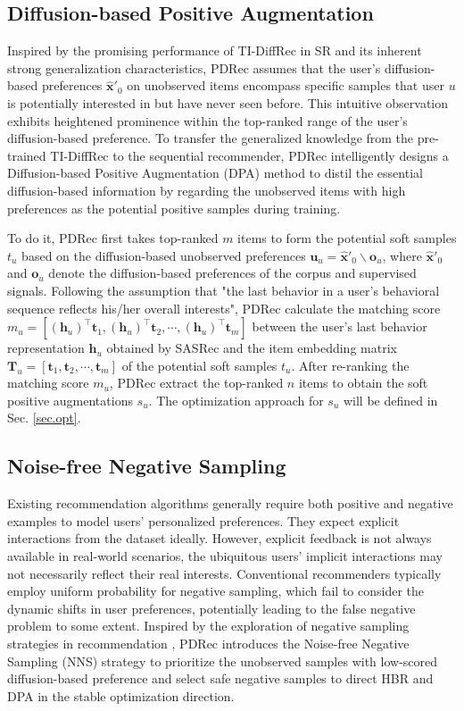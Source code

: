 \documentclass[letterpaper]{article} %
\begin{document}
\subsection{Diffusion-based Positive Augmentation}
Inspired by the promising performance of TI-DiffRec in SR and its inherent strong generalization characteristics, PDRec assumes that the user's diffusion-based preferences $\bm{\hat{x}'}_{0}$ on unobserved items encompass specific samples that user $u$ is potentially interested in but have never seen before. This intuitive observation exhibits heightened prominence within the top-ranked range of the user's diffusion-based preference. To transfer the generalized knowledge from the pre-trained TI-DiffRec to the sequential recommender, PDRec intelligently designs a Diffusion-based Positive Augmentation (DPA) method to distil the essential diffusion-based information by regarding the unobserved items with high preferences as the potential positive samples during training.

To do it, PDRec first takes top-ranked $m$ items to form the potential soft samples $t_{u}$ based on the diffusion-based unobserved preferences $\bm{u}_{u}\!=\!\bm{\hat{x}'}_{0}\!\backslash\!\bm{o}_{u}$, where $\bm{\hat{x}'}_{0}$ and $\bm{o}_{u}$ denote the diffusion-based preferences of the corpus and supervised signals.
Following the assumption that "the last behavior in a user's behavioral sequence reflects his/her overall interests", PDRec calculate the matching score
$m_u=[(\bm{h}_u)^\top\bm{t}_1,(\bm{h}_u)^\top\bm{t}_2,\cdots,(\bm{h}_u)^\top\bm{t}_m]$
between the user's last behavior representation $\bm{h}_u$ obtained by SASRec \cite{SASRec} and the item embedding matrix $\bm{T}_u=[\bm{t}_1,\bm{t}_2,\cdots,\bm{t}_m]$ of the potential soft samples $t_{u}$. After re-ranking the matching score $m_u$, PDRec extract the top-ranked $n$ items to obtain the soft positive augmentations $s_{u}$. The optimization approach for $s_{u}$ will be defined in Sec. \ref{sec.opt}.


\subsection{Noise-free Negative Sampling}
Existing recommendation algorithms generally require both positive and negative examples to model users' personalized preferences. They expect explicit interactions from the dataset ideally. However, explicit feedback is not always available in real-world scenarios, the ubiquitous users' implicit interactions may not necessarily reflect their real interests. Conventional recommenders typically employ uniform probability for negative sampling, which fail to consider the dynamic shifts in user preferences, potentially leading to the false negative problem to some extent. Inspired by the exploration of negative sampling strategies in recommendation \cite{DNS+, RealHNS}, PDRec introduces the Noise-free Negative Sampling (NNS) strategy to prioritize the unobserved samples with low-scored diffusion-based preference and select safe negative samples to direct HBR and DPA in the stable optimization direction.
\end{document}

